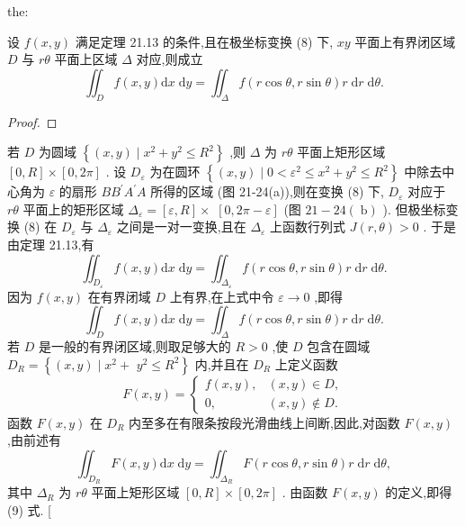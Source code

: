 \begin{theorem}{}{the:}

\end{theorem}
 设 \(f\left( {x,y}\right)\) 满足定理 21.13 的条件,且在极坐标变换 (8) 下, \({xy}\) 平面上有界闭区域 \(D\) 与 \({r\theta }\) 平面上区域 \(\Delta\) 对应,则成立
\[
{\iint }_{D}f\left( {x,y}\right) \mathrm{d}x\mathrm{\;d}y = {\iint }_{\Delta }f\left( {r\cos \theta ,r\sin \theta }\right) r\mathrm{\;d}r\mathrm{\;d}\theta . \tag{9}
\]
\begin{proof}

\end{proof}
若 \(D\) 为圆域 \(\left\{  {\left( {x,y}\right)  \mid  {x}^{2} + {y}^{2} \leq  {R}^{2}}\right\}\) ,则 \(\Delta\) 为 \({r\theta }\) 平面上矩形区域 \(\left\lbrack  {0,R}\right\rbrack   \times  \left\lbrack  {0,{2\pi }}\right\rbrack\) . 设 \({D}_{\varepsilon }\) 为在圆环 \(\left\{  {\left( {x,y}\right)  \mid  0 < {\varepsilon }^{2} \leq  {x}^{2} + {y}^{2} \leq  {R}^{2}}\right\}\) 中除去中心角为 \(\varepsilon\) 的扇形 \(B{B}^{\prime }{A}^{\prime }A\) 所得的区域 (图 21-24(a)),则在变换 (8) 下, \({D}_{\varepsilon }\) 对应于 \({r\theta }\) 平面上的矩形区域 \({\Delta }_{\varepsilon } = \left\lbrack  {\varepsilon ,R}\right\rbrack   \times\)  \(\left\lbrack  {0,{2\pi } - \varepsilon }\right\rbrack\) (图 \({21} - {24}\left( \mathrm{\;b}\right)\) ). 但极坐标变换 (8) 在 \({D}_{\varepsilon }\) 与 \({\Delta }_{\varepsilon }\) 之间是一对一变换,且在 \({\Delta }_{\varepsilon }\) 上函数行列式 \(J\left( {r,\theta }\right)  > 0\) . 于是由定理 21.13,有
\[
{\iint }_{{D}_{\varepsilon }}f\left( {x,y}\right) \mathrm{d}x\mathrm{\;d}y = {\iint }_{{\Delta }_{\varepsilon }}f\left( {r\cos \theta ,r\sin \theta }\right) r\mathrm{\;d}r\mathrm{\;d}\theta .
\]
因为 \(f\left( {x,y}\right)\) 在有界闭域 \(D\) 上有界,在上式中令 \(\varepsilon  \rightarrow  0\) ,即得
\[
{\iint }_{D}f\left( {x,y}\right) \mathrm{d}x\mathrm{\;d}y = {\iint }_{\Delta }f\left( {r\cos \theta ,r\sin \theta }\right) r\mathrm{\;d}r\mathrm{\;d}\theta .
\]
若 \(D\) 是一般的有界闭区域,则取足够大的 \(R > 0\) ,使 \(D\) 包含在圆域 \({D}_{R} = \left\{  {\left( {x,y}\right)  \mid  {x}^{2} + }\right.\)  \(\left. {{y}^{2} \leq  {R}^{2}}\right\}\) 内,并且在 \({D}_{R}\) 上定义函数
\[
F\left( {x,y}\right)  = \left\{  \begin{array}{ll} f\left( {x,y}\right) , & \left( {x,y}\right)  \in  D, \\  0, & \left( {x,y}\right)  \notin  D. \end{array}\right.
\]
函数 \(F\left( {x,y}\right)\) 在 \({D}_{R}\) 内至多在有限条按段光滑曲线上间断,因此,对函数 \(F\left( {x,y}\right)\) ,由前述有
\[
{\iint }_{{D}_{R}}F\left( {x,y}\right) \mathrm{d}x\mathrm{\;d}y = {\iint }_{{\Delta }_{R}}F\left( {r\cos \theta ,r\sin \theta }\right) r\mathrm{\;d}r\mathrm{\;d}\theta ,
\]
其中 \({\Delta }_{R}\) 为 \({r\theta }\) 平面上矩形区域 \(\left\lbrack  {0,R}\right\rbrack   \times  \left\lbrack  {0,{2\pi }}\right\rbrack\) . 由函数 \(F\left( {x,y}\right)\) 的定义,即得 (9) 式. [

